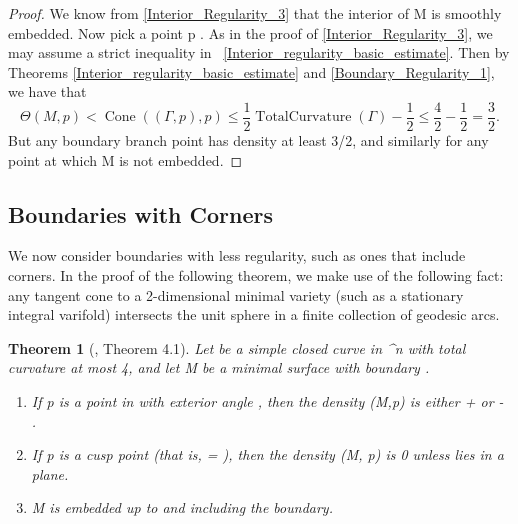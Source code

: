 \documentclass[a4paper, 11pt]{article}
\theoremstyle{plain}
\newtheorem{theorem}{Theorem}[section]
\theoremstyle{definition}
\theoremstyle{remark}
\numberwithin{equation}{subsection}
\def\({}
\def\){}
\def\pi{}
\begin{document}
\begin{proof}
We know from \cref{Interior_Regularity_3} that the interior of \(M\) is smoothly embedded. Now pick a point \(p \in \Gamma\). As in the proof of  \cref{Interior_Regularity_3}, we may assume a strict inequality in \ \cref{Interior_regularity_basic_estimate}. Then by Theorems \ref{Interior_regularity_basic_estimate} and \ref{Boundary_Regularity_1}, we have that
\begin{equation}
\Theta(M,p) < \operatorname{Cone}((\Gamma, p), p) \leqslant \frac{1}{2\pi}\operatorname{TotalCurvature}(\Gamma) - \frac{1}{2} \leqslant \frac{4\pi}{2\pi} - \frac{1}{2} = \frac{3}{2}.
\end{equation}
But any boundary branch point has density at least \(3/2\), and similarly for any point at which \(M\) is not embedded.
\end{proof}

\subsection{Boundaries with Corners}

We now consider boundaries with less regularity, such as ones that include corners. In the proof of the following theorem, we make use of the following fact: any tangent cone to a \(2\)-dimensional minimal variety (such as a stationary integral varifold) intersects the unit sphere in a finite collection of geodesic arcs.

\begin{theorem}[{\cite{EWW02}, Theorem 4.1}]
\label{Boundary_Corners}
Let \(\Gamma\) be a simple closed curve in \(^{n}\) with total curvature at most \(4\pi\), and let \(M\) be a minimal surface with boundary \(\Gamma\).

\begin{enumerate}
\item[(i)] If \(p\) is a point in \(\Gamma\) with exterior angle \(\theta\), then the density \(\Theta(M,p)\) is either \( + \frac{\theta}{2\pi}\) or  \( - \frac{\theta}{2\pi}\).
\item[(ii)] If \(p\) is a cusp point (that is, \(\theta = \pi\)), then the density \(\Theta(M, p)\) is  \(0\) unless \(\Gamma\) lies in a plane.
\item[(iii)] \(M\) is embedded up to and including the boundary.
\end{enumerate}
\end{theorem}
\end{document}
